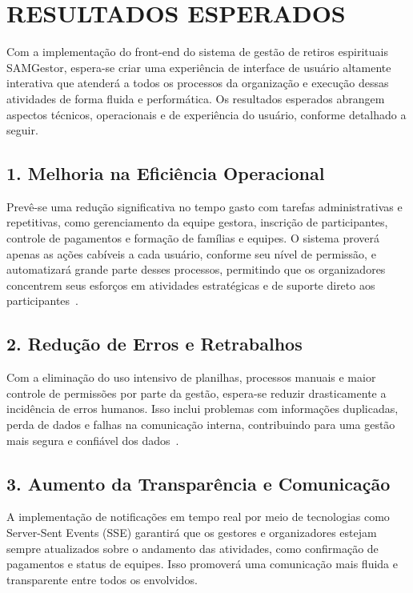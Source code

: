 \chapter{RESULTADOS ESPERADOS}

Com a implementação do front-end do sistema de gestão de retiros espirituais SAMGestor, espera-se criar uma experiência de interface de usuário altamente interativa que atenderá a todos os processos da organização e execução dessas atividades de forma fluida e performática. Os resultados esperados abrangem aspectos técnicos, operacionais e de experiência do usuário, conforme detalhado a seguir.

\section*{1. Melhoria na Eficiência Operacional}

Prevê-se uma redução significativa no tempo gasto com tarefas administrativas e repetitivas, como gerenciamento da equipe gestora, inscrição de participantes, controle de pagamentos e formação de famílias e equipes. O sistema proverá apenas as ações cabíveis a cada usuário, conforme seu nível de permissão, e automatizará grande parte desses processos, permitindo que os organizadores concentrem seus esforços em atividades estratégicas e de suporte direto aos participantes~\cite{sommerville2011}.

\section*{2. Redução de Erros e Retrabalhos}

Com a eliminação do uso intensivo de planilhas, processos manuais e maior controle de permissões por parte da gestão, espera-se reduzir drasticamente a incidência de erros humanos. Isso inclui problemas com informações duplicadas, perda de dados e falhas na comunicação interna, contribuindo para uma gestão mais segura e confiável dos dados~\cite{pressman2016}.

\section*{3. Aumento da Transparência e Comunicação}

A implementação de notificações em tempo real por meio de tecnologias como Server-Sent Events (SSE) garantirá que os gestores e organizadores estejam sempre atualizados sobre o andamento das atividades, como confirmação de pagamentos e status de equipes. Isso promoverá uma comunicação mais fluida e transparente entre todos os envolvidos.

